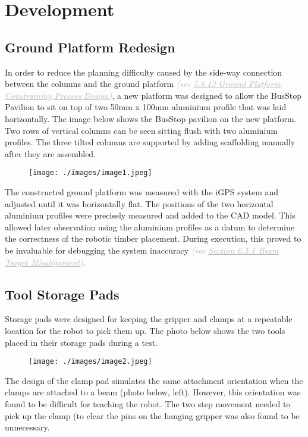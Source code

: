 \section{Development}

\subsection{Ground Platform Redesign}

In order to reduce the planning difficulty caused by the side-way connection between the columns and the ground platform \textit{\textcolor[HTML]{B7B7B7}{(see \uline{5.6.13 Ground Platform Constraining Process Design})}}, a new platform was designed to allow the BusStop Pavilion to sit on top of two 50mm x 100mm aluminium profile that was laid horizontally. The image below shows the BusStop pavilion on the new platform. Two rows of vertical columns can be seen sitting flush with two aluminium profiles. The three tilted columns are supported by adding scaffolding manually after they are assembled.

\begin{figure}[H]
\texttt{[image: ./images/image1.jpeg]}
\end{figure}


The constructed ground platform was measured with the iGPS system and adjusted until it was horizontally flat. The positions of the two horizontal aluminium profiles were precisely measured and added to the CAD model. This allowed later observation using the aluminium profiles as a datum to determine the correctness of the robotic timber placement. During execution, this proved to be invaluable for debugging the system inaccuracy \textit{\textcolor[HTML]{B7B7B7}{(see \uline{Section 6.5.1 Beam Target Misalignment})}}.

\subsection{Tool Storage Pads}

Storage pads were designed for keeping the gripper and clamps at a repeatable location for the robot to pick them up. The photo below shows the two tools placed in their storage pads during a test. 

\begin{figure}[H]
\texttt{[image: ./images/image2.jpeg]}
\end{figure}


The design of the clamp pad simulates the same attachment orientation when the clamps are attached to a beam (photo below, left). However, this orientation was found to be difficult for teaching the robot. The two step movement needed to pick up the clamp (to clear the pins on the hanging gripper was also found to be unnecessary. 

